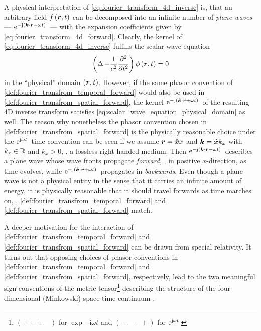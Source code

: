 A physical interpretation of \eqref{eq:fourier_transform_4d_inverse} is,
that an arbitrary field $f \left( \robs, t \right)$ can be decomposed 
into an infinite number of \emph{plane waves}
--- $\exp{-\im \left( \pvec{k} \cdot \robs - \omega t \right)}$ ---
with the expansion
coefficients given by \eqref{eq:fourier_transform_4d_forward}.
Clearly, the kernel of \eqref{eq:fourier_transform_4d_inverse} fulfills
the scalar wave equation \cite[\S18-6]{Feynman2011}
\begin{equation}\label{eq:scalar_wave_equation_physical_domain}
	\left( \laplace - \frac{1}{c^2} \frac{\partial^2}{\partial t^2} \right)	
	\phi \left( \pvec{r}, t \right) = 0
\end{equation}
in the \enquote{physical} domain $\left(\pvec{r}, t\right)$.
However, if the same phasor convention of
\cref{def:fourier_transfrom_temporal_forward} would also be used in
\cref{def:fourier_transfrom_spatial_forward}, the kernel
$\exp{-\im \left( \pvec{k} \cdot \robs + \omega t \right)}$
of the resulting 4D inverse transform satisfies
\eqref{eq:scalar_wave_equation_physical_domain} as well.
The reason why nonetheless the phasor convention chosen in
\cref{def:fourier_transfrom_spatial_forward} is the physically reasonable choice
under the $\mathrm{e}^{\mathrm{j} \omega t}\,$ time convention
can be seen if we assume $\pvec{r} = \uv{x} x$ and $\pvec{k} = \uv{x} k_x$
with $k_x \in \mathbb{R}$ and $k_x > 0$, \ie, a lossless right-handed medium.
Then $\exp{-\im \left( \pvec{k} \cdot \robs - \omega t \right)}$ describes
a plane wave whose wave fronts propagate \emph{forward}, \ie, in positive
$x$-direction, as time evolves, while
$\exp{-\im \left( \pvec{k} \cdot \robs + \omega t \right)}$
propagates in \emph{backwards}.
Even though a plane wave is not a physical entity in the sense that it carries
an infinite amount of energy, it is physically reasonable that it should
travel forwards as time marches on, \ie,
\cref{def:fourier_transfrom_temporal_forward} and
\cref{def:fourier_transfrom_spatial_forward} match.

A deeper motivation for the interaction of
\cref{def:fourier_transfrom_temporal_forward} and 
\cref{def:fourier_transfrom_spatial_forward} can be drawn from special
relativity.
It turns out that opposing choices of phasor conventions in
\cref{def:fourier_transfrom_temporal_forward} and
\cref{def:fourier_transfrom_spatial_forward}, respectively, lead to the two
meaningful sign conventions of the metric tensor\footnote{
	$\left( + + + - \right)$ for $\exp{-\mathrm{i} \omega t}$
	and $\left( - - - + \right)$ for $\mathrm{e}^{\mathrm{j} \omega t}\,$}
describing the structure of the four-dimensional (Minkowski) space-time
continuum \cite[pp.~624]{Jackson2013}\cite{Kaiser2016}.





